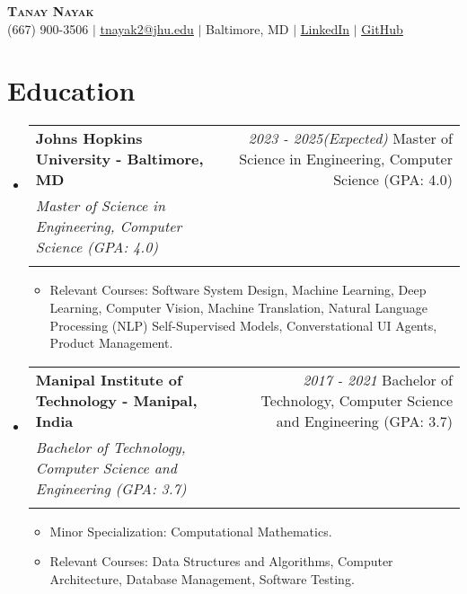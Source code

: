 \documentclass[letterpaper,10pt]{article} %
\makeatletter
\newcommand{\resumeItem}[1]{
  \item\small{
    {#1 \vspace{-1pt}}
  }
}
\newcommand{\resumeSubheading}[4]{
  \vspace{-2pt}\item
    \begin{tabular*}{0.97\textwidth}[t]{l@{\extracolsep{\fill}}r}
      \textbf{#1 - #2} & \textit{\small #4}
      \def\temp{#3}%
      \ifx\temp\empty %
      \else
        \\
        \textit{\small#3}\\
      \fi
    \end{tabular*}\vspace{-7pt}
}
\newcommand{\resumeSubHeadingListStart}{\begin{itemize}[leftmargin=0.15in, label={}]}
\newcommand{\resumeSubHeadingListEnd}{\end{itemize}}
\newcommand{\resumeItemListStart}{\begin{itemize}}
\newcommand{\resumeItemListEnd}{\end{itemize}\vspace{-5pt}}
\makeatother
\begin{document}
\begin{center}
    \textbf{\Huge \scshape Tanay Nayak} \\ \vspace{1pt}
    \small (667) 900-3506 $|$ \href{mailto:tnayak2@jhu.edu}{\underline{tnayak2@jhu.edu}} $|$ 
    Baltimore, MD $|$
    \href{https://www.linkedin.com/in/tanay-nayak/}{\underline{LinkedIn}} $|$
    \href{https://github.com/tanaynayak}{\underline{GitHub}}
\end{center}

\section{Education}
  \resumeSubHeadingListStart
    \resumeSubheading
      {Johns Hopkins University}{Baltimore, MD}
      {Master of Science in Engineering, Computer Science (GPA: 4.0)}{2023 - 2025(Expected)}
    \begin{itemize}
        \resumeItem{Relevant Courses: Software System Design, Machine Learning, Deep Learning, Computer Vision, Machine Translation, Natural Language Processing (NLP) Self-Supervised Models, Converstational UI Agents, Product Management.}
    \end{itemize}
    
    \resumeSubheading
      {Manipal Institute of Technology}{Manipal, India}
      {Bachelor of Technology, Computer Science and Engineering (GPA: 3.7)}{2017 - 2021}
    \resumeItemListStart
        \resumeItem{Minor Specialization: Computational Mathematics.}
        \resumeItem{ Relevant Courses: Data Structures and Algorithms, Computer Architecture, Database Management, Software Testing.}
    \resumeItemListEnd
  \resumeSubHeadingListEnd
\end{document}
